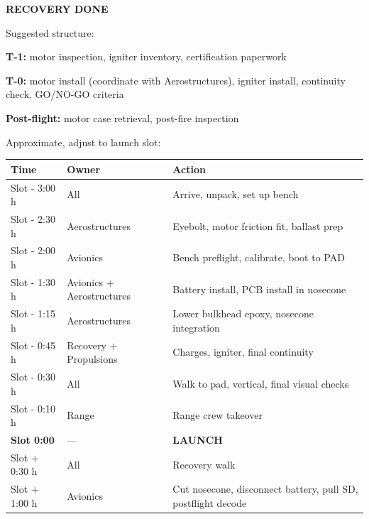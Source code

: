 \documentclass[11pt,a4paper,oneside]{report}
\newcommand{\done}[1]{\bigskip\begin{center}\sffamily\bfseries\Large\textcolor{rocketred}{#1}\end{center}\bigskip}
\begin{document}
\done{RECOVERY DONE}



Suggested structure:
\begin{plainitem}
  \item \textbf{T-1:} motor inspection, igniter inventory, certification paperwork
  \item \textbf{T-0:} motor install (coordinate with Aerostructures), igniter install, continuity check, GO/NO-GO criteria
  \item \textbf{Post-flight:} motor case retrieval, post-fire inspection
\end{plainitem}


Approximate, adjust to launch slot:

\renewcommand{\arraystretch}{1.3}
\begin{longtable}{@{}p{3cm} p{4.5cm} p{8cm}@{}}
\toprule
\textbf{Time} & \textbf{Owner} & \textbf{Action} \\
\midrule
\endhead
Slot - 3:00 h & All & Arrive, unpack, set up bench \\
Slot - 2:30 h & Aerostructures & Eyebolt, motor friction fit, ballast prep \\
Slot - 2:00 h & Avionics & Bench preflight, calibrate, boot to PAD \\
Slot - 1:30 h & Avionics + Aerostructures & Battery install, PCB install in nosecone \\
Slot - 1:15 h & Aerostructures & Lower bulkhead epoxy, nosecone integration \\
Slot - 0:45 h & Recovery + Propulsions & Charges, igniter, final continuity \\
Slot - 0:30 h & All & Walk to pad, vertical, final visual checks \\
Slot - 0:10 h & Range & Range crew takeover \\
\textbf{Slot 0:00} & --- & \textbf{LAUNCH} \\
Slot + 0:30 h & All & Recovery walk \\
Slot + 1:00 h & Avionics & Cut nosecone, disconnect battery, pull SD, postflight decode \\
\bottomrule
\end{longtable}
\end{document}
